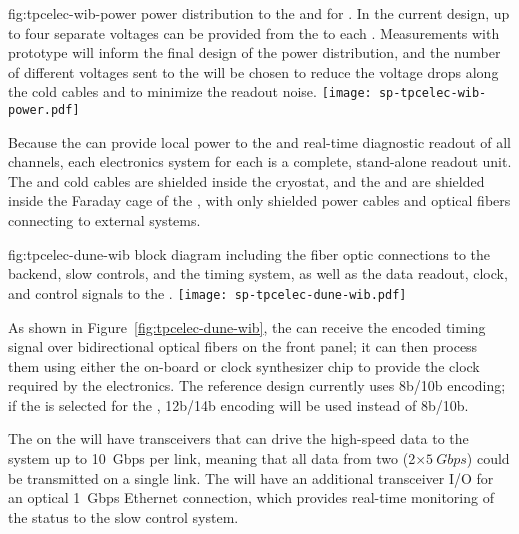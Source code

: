 \begin{dunefigure}
{fig:tpcelec-wib-power}
{ power distribution to the  and  
for . In the current design, up to four separate 
voltages can be provided from the  to each .
Measurements with prototype  will inform the final
design of the power distribution, and the number of different
voltages sent to the  will be chosen to reduce the
voltage drops along the cold cables and to minimize the readout
noise.}
\texttt{[image: sp-tpcelec-wib-power.pdf]}
\end{dunefigure}

Because the  can provide local power to the  
and real-time diagnostic readout of all channels, each  electronics 
system for each  is a complete, stand-alone readout unit. 
The  and cold cables are shielded inside the cryostat, 
and the  and  are shielded inside the Faraday 
cage of the , with only shielded power 
cables and optical fibers connecting to external systems.

\begin{dunefigure}
{fig:tpcelec-dune-wib}
{ block diagram including the fiber optic connections to
the  backend, slow controls, and the timing system, as well as the
data readout, clock, and control signals to the .}
\texttt{[image: sp-tpcelec-dune-wib.pdf]}
\end{dunefigure}

As shown in Figure~\ref{fig:tpcelec-dune-wib}, the  can
receive the encoded timing signal over bidirectional optical
fibers on the front panel; it can then process them using either the on-board
 or clock synthesizer chip to provide the clock required
by the  electronics.
The reference  design 
currently uses 8b/10b encoding; if the   
 is selected for the  , 
12b/14b encoding will be used instead of 8b/10b.

The  on the  will have transceivers that can 
drive the high-speed data to the  system up to
\SI{10}{Gbps} per link, meaning that all data from
two  (2$\times\SI{5}{Gbps}$) could be transmitted 
on a single link. The  will have an additional 
transceiver I/O for an optical \SI{1}{Gbps} Ethernet connection, which 
provides real-time monitoring of the  status to the slow control system.

